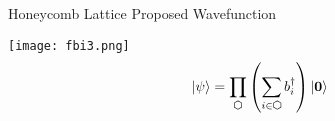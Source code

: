 \begin{block}{Honeycomb Lattice Proposed Wavefunction}
\begin{center}
    \texttt{[image: fbi3.png]}
$$
\ket{\psi} = \prod\limits_{\varhexagon} \left(\sum\limits_{i \in \varhexagon} b^{\dagger}_i \right) \ket{\mathbf{0}}
$$
\end{center}
\end{block}
